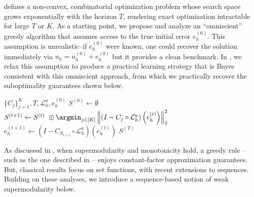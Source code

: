 \documentclass{article} %
\begin{document}
 defines a non-convex, combinatorial optimization problem whose search space grows exponentially with the horizon $T$, rendering exact optimization intractable for large $T$ or $K$. As a starting point, we propose and analyze an ``omniscient'' greedy algorithm that assumes access to the true initial error $e^{(0)}_h$. This assumption is unrealistic--if $e^{(0)}_h$ were known, one could recover the solution immediately via $u_h = u^{(0)}_h + e^{(0)}_h$ but it provides a clean benchmark. 
In , we relax this assumption 
to produce a practical learning strategy that is Bayes consistent with this omniscient approach, from which we practically recover the suboptimality guarantees shown below.




\begin{algorithm} 
\caption{Greedy Algorithm for a Hybrid PDE solver}\label{alg:greedy}
\begin{algorithmic}
\Require $\{C_{j}\}_{j = 1}^{K}, T, \mathcal{L}_h^a, e^{(0)}_h$
\State $S^{(0)} \gets \emptyset$
    \State $S^{(t + 1)} \gets S^{(t)} \ \oplus \argmin_{j \in [K]}\left\|\left( I - C_{j} \circ \mathcal{L}_{h}^a\right)\left(e^{(t)}_h\right)\right\|^2_2$
    \State $e^{(t + 1)}_h \gets \left(I - C_{S_{t+ 1}} \circ \mathcal{L}_{h}^a\right) \left(e^{(t)}_h\right)$
\EndFor
\State \Return $S^{(T)}$
\end{algorithmic}

\end{algorithm}


As discussed in , when supermodularity and monotonicity hold, a greedy rule -- such as the one described in  -- enjoys constant-factor approximation guarantees. But, classical results focus on set functions, with recent extensions to sequences. Building on these analyses, we introduce a sequence-based notion of weak supermodularity below.
\end{document}
